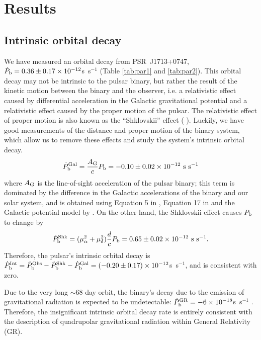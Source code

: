 \section{Results}
\label{sec:res}

\subsection{Intrinsic orbital decay}
\label{sec:obdecay}
We have measured an orbital decay from PSR~J1713+0747, $\dot{P}_{\rm b} =
0.36\pm0.17\times10^{-12}$s~s$^{-1}$ (Table \ref{tab:par1} and \ref{tab:par2}).
This orbital decay may not be intrinsic to the pulsar binary, but rather the
result of the kinetic motion between the binary and the
observer, i.e. a relativistic effect caused by differential 
acceleration in the Galactic gravitational potential
\citep{dt91} and a relativistic effect caused by the proper motion of the
pulsar. The relativistic effect
of proper motion is also known as the ``Shklovskii'' effect (
\citealt{shk70}). Luckily, we have good measurements of the distance and proper
motion of the binary system, which allow us to remove these effects and study the system's intrinsic orbital decay.
\begin{equation}
\dot{P}_{\rm b}^{\rm Gal} = \frac{A_{\rm G}}{c} P_{\rm b} =
-0.10\pm0.02\times10^{-12}~{\rm s~s^{-1}}
\end{equation}
where $A_{\rm G}$ is the line-of-sight acceleration of the pulsar binary;
this term is dominated by the difference in the Galactic accelerations of the
binary and our solar system, and is obtained using
Equation 5 in \citet{nt95}, Equation 17 in \citet{lwj+09} and the Galactic
potential model by \citet{hf04a}.
On the other hand, the Shklovskii effect causes $P_{\rm b}$ to
change by
\begin{equation}
\dot{P}_{\rm b}^{\rm Shk} = (\mu_{\alpha}^2+\mu_{\delta}^2)\frac{d}{c}P_{\rm
b} = 0.65\pm0.02\times10^{-12}~{\rm s~s^{-1}}.
\end{equation}
Therefore, the pulsar's intrinsic orbital decay is $\dot{P}_{\rm b}^{\rm Int}
= \dot{P}_{\rm b}^{\rm Obs} - \dot{P}_{\rm b}^{\rm Shk} - \dot{P}_{\rm b}^{\rm
Gal} = (-0.20\pm0.17)\times10^{-12}$s~s$^{-1}$, and is consistent with zero.

Due to the very long $\sim$68 day orbit, the binary's decay due to the
emission of gravitational
radiation is expected to be undetectable: $\dot{P}_{\rm b}^{\rm GR} =
-6\times10^{-18}$s~s$^{-1}$ \citep{lk05}.  Therefore, the insignificant
intrinsic orbital decay rate is entirely consistent with the
description of quadrupolar gravitational radiation within General
Relativity (GR).


